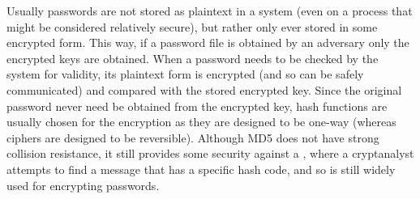 Usually passwords are not stored as plaintext in a system (even on
a process that might be considered relatively secure), but rather
only ever stored in some encrypted form. This way, if a password
file is obtained by an adversary only the encrypted keys are
obtained. When a password needs to be checked by the system for
validity, its plaintext form is encrypted (and so can be safely
communicated) and compared with the stored encrypted key. Since
the original password never need be obtained from the encrypted
key, hash functions are usually chosen for the encryption as they
are designed to be one-way (whereas ciphers are designed to be
reversible). Although MD5 does not have strong collision
resistance, it still provides some security against a
, where a cryptanalyst attempts to find a
message that has a specific hash code, and so is still widely used
for encrypting passwords.

